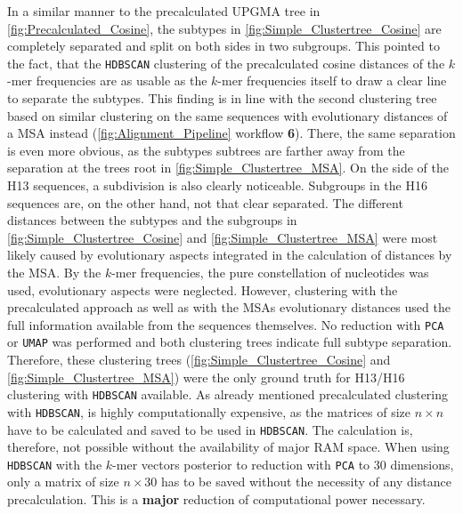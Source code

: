 In a similar manner to the precalculated \gls{UPGMA} tree in \autoref{fig:Precalculated_Cosine}, the subtypes in \autoref{fig:Simple_Clustertree_Cosine} are completely separated and split on both sides in two subgroups. This pointed to the fact, that the \texttt{HDBSCAN} clustering of the precalculated cosine distances of the $k$-mer frequencies are as usable as the $k$-mer frequencies itself to draw a clear line to separate the subtypes. This finding is in line with the second clustering tree based on similar clustering on the same sequences with evolutionary distances of a \gls{MSA} instead (\autoref{fig:Alignment_Pipeline} workflow \textsf{\textbf{6}}). There, the same separation is even more obvious, as the subtypes subtrees are farther away from the separation at the trees root in \autoref{fig:Simple_Clustertree_MSA}. On the side of the H13 sequences, a subdivision is also clearly noticeable. Subgroups in the H16 sequences are, on the other hand, not that clear separated. The different distances between the subtypes and the subgroups in \autoref{fig:Simple_Clustertree_Cosine} and \autoref{fig:Simple_Clustertree_MSA} were most likely caused by evolutionary aspects integrated in the calculation of distances by the \gls{MSA}. By the $k$-mer frequencies, the pure constellation of nucleotides was used, evolutionary aspects were neglected. However, clustering with the precalculated approach as well as with the \glspl{MSA} evolutionary distances used the full information available from the sequences themselves. No reduction with \texttt{PCA} or \texttt{UMAP} was performed and both clustering trees indicate full subtype separation. Therefore, these clustering trees (\autoref{fig:Simple_Clustertree_Cosine} and \autoref{fig:Simple_Clustertree_MSA}) were the only ground truth for H13/H16 clustering with \texttt{HDBSCAN} available. As already mentioned precalculated clustering with \texttt{HDBSCAN}, is highly computationally expensive, as the matrices of size $n \times n$ have to be calculated and saved to be used in \texttt{HDBSCAN}. The calculation is, therefore, not possible without the availability of major RAM space. When using \texttt{HDBSCAN} with the $k$-mer vectors posterior to reduction with \texttt{PCA} to 30 dimensions, only a matrix of size $n\times 30$ has to be saved without the necessity of any distance precalculation. This is a \textbf{major} reduction of computational power necessary. 

\vspace{1em}

